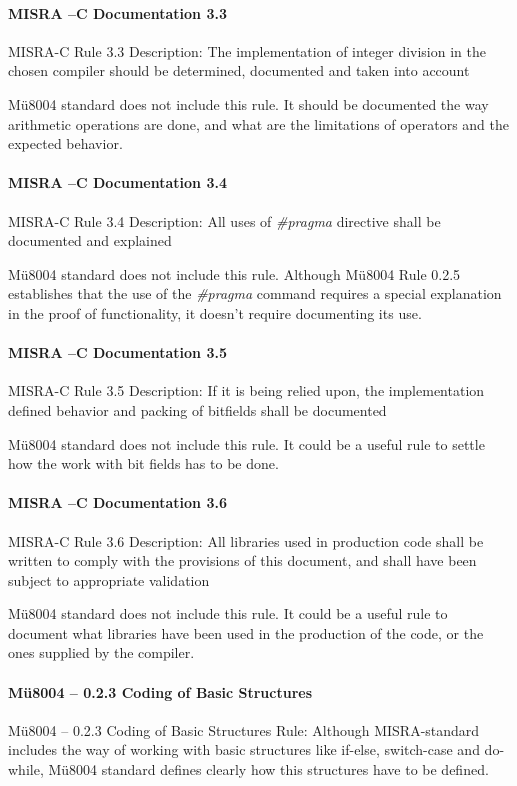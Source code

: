 \paragraph{MISRA –C Documentation 3.3}
MISRA-C Rule 3.3 Description: The implementation of integer division in the chosen compiler should be determined, documented and taken into account

Mü8004 standard does not include this rule. It should be documented the way arithmetic operations are done, and what are the limitations of operators and the expected behavior.

\paragraph{MISRA –C Documentation 3.4}
MISRA-C Rule 3.4 Description: All uses of \textit{\#pragma} directive shall be documented and explained

Mü8004 standard does not include this rule. Although Mü8004 Rule 0.2.5 establishes that the use of the \textit{\#pragma} command requires a special explanation in the proof of functionality, it doesn’t require documenting its use. 

\paragraph{MISRA –C Documentation 3.5}
MISRA-C Rule 3.5 Description: If it is being relied upon, the implementation defined behavior and packing of bitfields shall be documented

Mü8004 standard does not include this rule. It could be a useful rule to settle how the work with bit fields has to be done. 

\paragraph{MISRA –C Documentation 3.6}
MISRA-C Rule 3.6 Description: All libraries used in production code shall be written to comply with the provisions of this document, and shall have been subject to appropriate validation

Mü8004 standard does not include this rule. It could be a useful rule to document what libraries have been used in the production of the code, or the ones supplied by the compiler.

\paragraph{Mü8004 – 0.2.3 Coding of Basic Structures}
Mü8004 – 0.2.3 Coding of Basic Structures Rule: Although MISRA-standard includes the way of working with basic structures like if-else, switch-case and do-while, Mü8004 standard defines clearly how this structures have to be defined.

